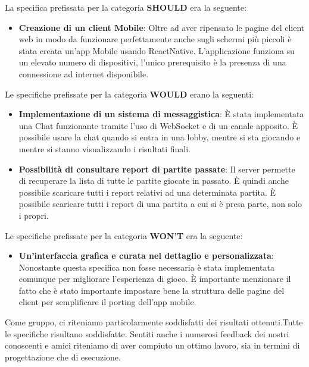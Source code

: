 \noindent La specifica prefissata per la categoria \textbf{SHOULD} era la seguente:
\begin{itemize}
    \item \textbf{Creazione di un client Mobile}:\newline
    Oltre ad aver ripensato le pagine del client web in modo da funzionare perfettamente anche sugli schermi più piccoli è stata creata un'app Mobile usando ReactNative. L'applicazione funziona su un elevato numero di dispositivi, l'unico prerequisito è la presenza di una connessione ad internet disponibile.
\end{itemize}

\noindent Le specifiche prefissate per la categoria \textbf{WOULD} erano la seguenti:
\begin{itemize}
    \item \textbf{Implementazione di un sistema di messaggistica}:\newline
    È stata implementata una Chat funzionante tramite l'uso di WebSocket e di un canale apposito. È possibile usare la chat quando si entra in una lobby, mentre si sta giocando e mentre si stanno visualizzando i risultati finali.
        \item \textbf{Possibilità di consultare report di partite passate}:\newline
        Il server permette di recuperare la lista di tutte le partite giocate in passato. È quindi anche possibile scaricare tutti i report relativi ad una determinata partita. È possibile scaricare tutti i report di una partita a cui si è presa parte, non solo i propri.
\end{itemize}

\noindent Le specifiche prefissate per la categoria \textbf{WON'T} era la seguente:
\begin{itemize}
    \item \textbf{Un'interfaccia grafica e curata nel dettaglio e personalizzata}:\newline
    Nonostante questa specifica non fosse necessaria è stata implementata comunque per migliorare l'esperienza di gioco. È importante menzionare il fatto che è stato importante impostare bene la struttura delle pagine del client per semplificare il porting dell'app mobile.
\end{itemize}

\noindent Come gruppo, ci riteniamo particolarmente soddisfatti dei risultati ottenuti.\newline Tutte le specifiche risultano soddisfatte. Sentiti anche i numerosi feedback dei nostri conoscenti e amici riteniamo di aver compiuto un ottimo lavoro, sia in termini di progettazione che di esecuzione.


